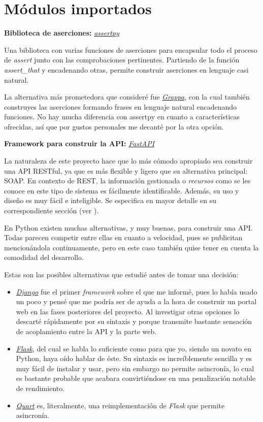 \section{Módulos importados}

\textbf{Biblioteca de aserciones:} \href{https://github.com/assertpy/assertpy}{\textit{assertpy}}

Una biblioteca con varias funciones de aserciones para encapsular todo el proceso de \textit{assert} junto con las comprobaciones pertinentes. Partiendo de la función \textit{assert\_that} y encadenando otras, permite construir aserciones en lenguaje casi natural.

La alternativa más prometedora que consideré fue \href{https://github.com/grappa-py/grappa}{\textit{Grappa}}, con la cual también construyes las aserciones formando frases en lenguaje natural encadenando funciones. No hay mucha diferencia con assertpy en cuanto a características ofrecidas, así que por gustos personales me decanté por la otra opción.

\textbf{Framework para construir la API:} \href{https://fastapi.tiangolo.com/}{\textit{FastAPI}}

La naturaleza de este proyecto hace que lo más cómodo apropiado sea construir una API RESTful, ya que es más flexible y ligero que su alternativa principal: SOAP. En contexto de REST, la información gestionada o \textit{recursos} como se les conoce en este tipo de sistema es fácilmente identificable. Además, su uso y diseño es muy fácil e inteligible. Se especifica en mayor detalle en su correspondiente sección (ver ).

En Python existen muchas alternativas, y muy buenas, para construir una API. Todas parecen competir entre ellas en cuanto a velocidad, pues se publicitan mencionándola continuamente, pero en este caso también quise tener en cuenta la comodidad del desarrollo.

Estas son las posibles alternativas que estudié antes de tomar una decisión:
\begin{itemize}
    \item \href{https://www.djangoproject.com/}{\textit{Django}} fue el primer \textit{framework} sobre el que me informé, pues lo había usado un poco y pensé que me podría ser de ayuda a la hora de construir un portal web en las fases posteriores del proyecto. Al investigar otras opciones lo descarté rápidamente por su sintaxis y porque transmite bastante sensación de acoplamiento entre la API y la parte web.
    \item \href{https://flask.palletsprojects.com/en/2.2.x/}{\textit{Flask}}, del cual se habla lo suficiente como para que yo, siendo un novato en Python, haya oído hablar de éste. Su sintaxis es increíblemente sencilla y es muy fácil de instalar y usar, pero sin embargo no permite asincronía, lo cual es bastante probable que acabara convirtiéndose en una penalización notable de rendimiento.
    \item \href{https://quart.palletsprojects.com/en/latest/}{\textit{Quart}} es, literalmente, una reimplementación de \textit{Flask} que permite asincronía.
\end{itemize}

